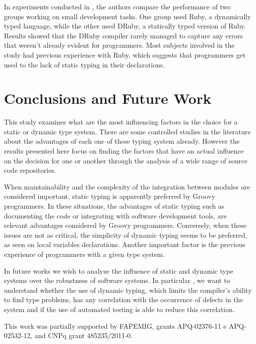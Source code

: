 \documentclass[preprint]{sigplanconf}
\begin{document}
In experiments conducted in \cite{ruby_vs_druby}, the authors compare the performance of two groups working on small development tasks.
One group used Ruby, a dynamically typed language, while the other used DRuby, a statically typed version of Ruby. 
Results showed that the DRuby compiler rarely managed to capture any errors that weren't already evident for programmers.
Most subjects involved in the study had previous experience with Ruby, which suggests that programmers get used to the lack of static typing in their declarations.

\section{Conclusions and Future Work\label{sec:Conclus=0000E3o-e-Trabalhos}}
This study examines what are the most influencing factors in the choice for a static or dynamic type system. 
There are some controlled studies in the literature about the advantages of each one of these typing system already. 
However the results presented here focus on finding the factors that have an actual influence on the decision for one or another through the analysis of a wide range of source code repositories.

When maintainability and the complexity of the integration between modules are considered important, static typing is apparently preferred by Groovy programmers. 
In these situations, the advantages of static typing such as documenting the code or integrating with software development tools, are relevant advantages considered by Groovy programmers.
Conversely, when these issues are not as critical, the simplicity of dynamic typing seems to be preferred, as seen on local variables declarations.
Another important factor is the previous experience of programmers with a given type system.

In future works we wish to analyze the influence of static and dynamic type systems over the robustness of software systems.
In particular , we want to understand whether the use of dynamic typing, which limits the compiler's ability to find type problems, has any correlation with the occurrence of defects in the system and if the use of automated testing is able to reduce this correlation.

\acks
This work was partially supported by FAPEMIG, grants APQ-02376-11 e APQ-02532-12, and CNPq grant 485235/2011-0. 
\end{document}
